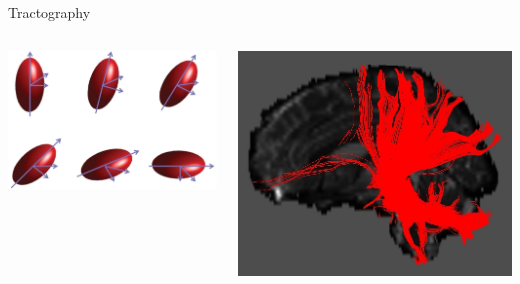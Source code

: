 \documentclass[aspectratio=169,xcolor=dvipsnames]{beamer}
\begin{document}
\begin{frame}{Tractography}
\begin{columns}
\begin{center}
\includegraphics[width=1\textwidth]{imgs/eigvec}
\end{center}


\begin{center}
\includegraphics[width=1\textwidth]{imgs/fibretracking}
\end{center}
\end{columns}
\end{frame}

\end{document}
